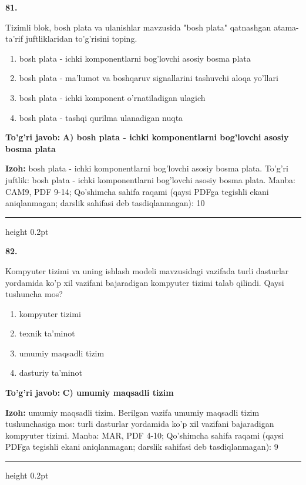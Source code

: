 \documentclass[10pt,a4paper]{article}
\begin{document}
{\bfseries\sffamily\color{ink} 81.}
\par
Tizimli blok, bosh plata va ulanishlar mavzusida "bosh plata" qatnashgan atama-ta'rif juftliklaridan to'g'risini toping.
\begin{enumerate}[label=\Alph*),leftmargin=9mm]
\item bosh plata - ichki komponentlarni bog'lovchi asosiy bosma plata
\item bosh plata - ma'lumot va boshqaruv signallarini tashuvchi aloqa yo'llari
\item bosh plata - ichki komponent o'rnatiladigan ulagich
\item bosh plata - tashqi qurilma ulanadigan nuqta
\end{enumerate}
\begin{tcolorbox}[enhanced,breakable,colback=teal!4,colframe=teal!60!black,boxrule=0.45pt,arc=1.2mm,left=2.7mm,right=2.7mm,top=1.8mm,bottom=1.8mm,before skip=2mm,after skip=2mm]
{\bfseries\sffamily\color{teal}To'g'ri javob:} \textbf{A) bosh plata - ichki komponentlarni bog'lovchi asosiy bosma plata}
\par\smallskip
{\bfseries Izoh:} bosh plata - ichki komponentlarni bog'lovchi asosiy bosma plata. To'g'ri juftlik: bosh plata - ichki komponentlarni bog'lovchi asosiy bosma plata. Manba: CAM9, PDF 9-14; Qo'shimcha sahifa raqami (qaysi PDFga tegishli ekani aniqlanmagan; darslik sahifasi deb tasdiqlanmagan): 10
\end{tcolorbox}
\vspace{2mm}\hrule height 0.2pt\vspace{3mm}

{\bfseries\sffamily\color{ink} 82.}
\par
Kompyuter tizimi va uning ishlash modeli mavzusidagi vazifada turli dasturlar yordamida ko'p xil vazifani bajaradigan kompyuter tizimi talab qilindi. Qaysi tushuncha mos?
\begin{enumerate}[label=\Alph*),leftmargin=9mm]
\item kompyuter tizimi
\item texnik ta'minot
\item umumiy maqsadli tizim
\item dasturiy ta'minot
\end{enumerate}
\begin{tcolorbox}[enhanced,breakable,colback=teal!4,colframe=teal!60!black,boxrule=0.45pt,arc=1.2mm,left=2.7mm,right=2.7mm,top=1.8mm,bottom=1.8mm,before skip=2mm,after skip=2mm]
{\bfseries\sffamily\color{teal}To'g'ri javob:} \textbf{C) umumiy maqsadli tizim}
\par\smallskip
{\bfseries Izoh:} umumiy maqsadli tizim. Berilgan vazifa umumiy maqsadli tizim tushunchasiga mos: turli dasturlar yordamida ko'p xil vazifani bajaradigan kompyuter tizimi. Manba: MAR, PDF 4-10; Qo'shimcha sahifa raqami (qaysi PDFga tegishli ekani aniqlanmagan; darslik sahifasi deb tasdiqlanmagan): 9
\end{tcolorbox}
\vspace{2mm}\hrule height 0.2pt\vspace{3mm}
\end{document}
